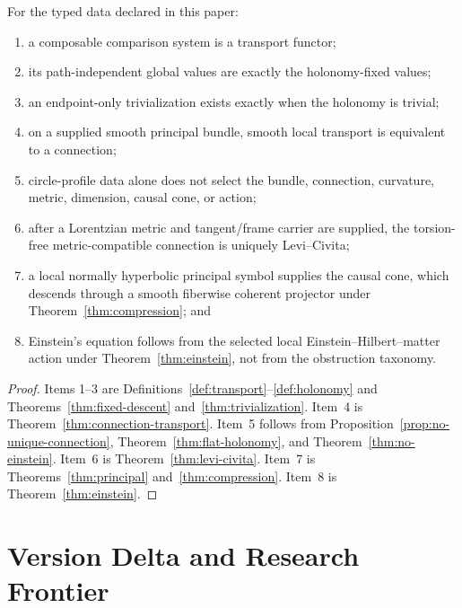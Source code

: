 \documentclass[11pt]{article}
\begin{document}
\begin{theorem}
\label{thm:scoped}
For the typed data declared in this paper:
\begin{enumerate}
\item a composable comparison system is a transport functor;
\item its path-independent global values are exactly the holonomy-fixed
values;
\item an endpoint-only trivialization exists exactly when the holonomy is
trivial;
\item on a supplied smooth principal bundle, smooth local transport is
equivalent to a connection;
\item circle-profile data alone does not select the bundle, connection,
curvature, metric, dimension, causal cone, or action;
\item after a Lorentzian metric and tangent/frame carrier are supplied, the
torsion-free metric-compatible connection is uniquely Levi--Civita;
\item a local normally hyperbolic principal symbol supplies the causal cone,
which descends through a smooth fiberwise coherent projector under
Theorem~\ref{thm:compression}; and
\item Einstein's equation follows from the selected local
Einstein--Hilbert--matter action under
Theorem~\ref{thm:einstein}, not from the obstruction taxonomy.
\end{enumerate}
\end{theorem}

\begin{proof}
Items 1--3 are Definitions~\ref{def:transport}--\ref{def:holonomy} and
Theorems~\ref{thm:fixed-descent} and~\ref{thm:trivialization}.  Item~4 is
Theorem~\ref{thm:connection-transport}.  Item~5 follows from
Proposition~\ref{prop:no-unique-connection},
Theorem~\ref{thm:flat-holonomy}, and
Theorem~\ref{thm:no-einstein}.  Item~6 is
Theorem~\ref{thm:levi-civita}.  Item~7 is
Theorems~\ref{thm:principal} and~\ref{thm:compression}.  Item~8 is
Theorem~\ref{thm:einstein}.
\end{proof}

\section{Version Delta and Research Frontier}
\end{document}
